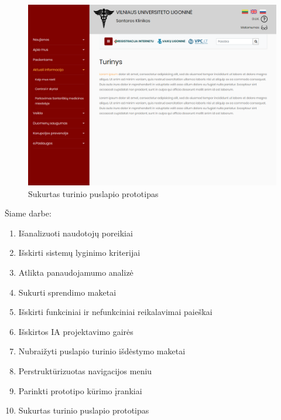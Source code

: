 \documentclass{VUMIFPSbakalaurinis}
\begin{document}
\begin{figure}[htb]
    \centering
    \includegraphics[scale=0.50]{img/Prototipas}
    \caption{Sukurtas turinio puslapio prototipas}
    \label{img:Prototipas}
\end{figure}

Šiame darbe:
\begin{enumerate}
	\item Išanalizuoti naudotojų poreikiai
	\item Išskirti sistemų lyginimo kriterijai
	\item Atlikta panaudojamumo analizė
	\item Sukurti sprendimo maketai
	\item Išskirti funkciniai ir nefunkciniai reikalavimai paieškai
	\item Išskirtos IA projektavimo gairės
	\item Nubraižyti puslapio turinio išdėstymo maketai
	\item Perstruktūrizuotas navigacijos meniu
	\item Parinkti prototipo kūrimo įrankiai
	\item Sukurtas turinio puslapio prototipas
\end{enumerate}
\end{document}
